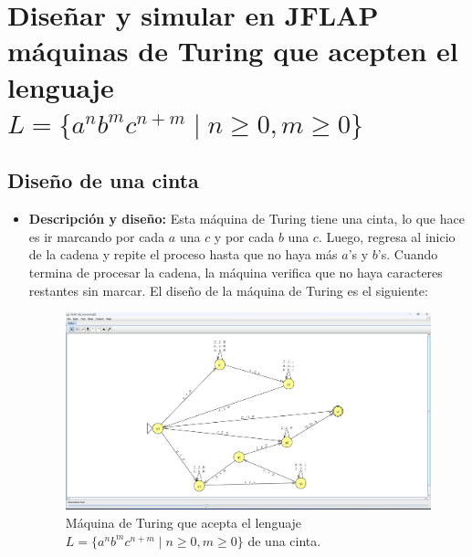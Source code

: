 \documentclass[11pt]{report}
\begin{document}
\newpage

\section{Diseñar y simular en JFLAP máquinas de Turing que acepten el lenguaje $L = \{a^nb^mc^{n+m} \mid n \geq 0, m \geq 0\}$}
\subsection{Diseño de una cinta}
\begin{itemize}
  \item \textbf{Descripción y diseño:} Esta máquina de Turing tiene una cinta, lo que hace es ir marcando por cada $a$ una $c$ y por cada $b$ una $c$. Luego, regresa al inicio de la cadena y repite el proceso hasta que no haya más $a$'s y $b$'s. Cuando termina de procesar la cadena, la máquina verifica que no haya caracteres restantes sin marcar. El diseño de la máquina de Turing es el siguiente:

        \begin{figure}[H]
          \centering
          \includegraphics[scale=0.33]{img/MT_02_one_ribbon.png}
          \caption{Máquina de Turing que acepta el lenguaje $L = \{a^nb^mc^{n+m} \mid n \geq 0, m \geq 0\}$ de una cinta.}
          \label{fig:maquina de turing que acepta el lenguaje L = {a^nb^mc^{n+m} | n >= 0, m >= 0}}
        \end{figure}

        \newpage


\end{itemize}
\end{document}
